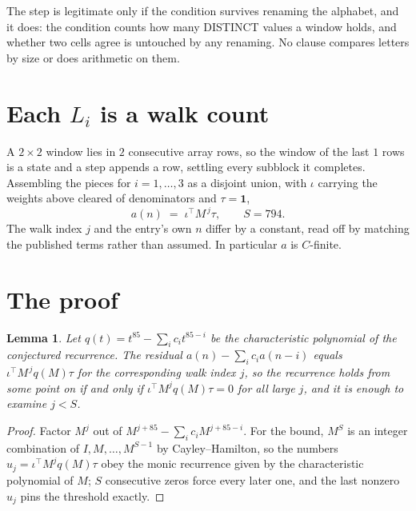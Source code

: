 \documentclass[11pt,a4paper]{article}
\theoremstyle{plain}
\newtheorem{lemma}[theorem]{Lemma}
\theoremstyle{definition}
\begin{document}
The step is legitimate only if the condition survives renaming the alphabet, and it does: the
condition counts how many DISTINCT values a window holds, and whether two cells agree is
untouched by any renaming. No clause compares letters by size or does arithmetic on them.

\section{Each $L_i$ is a walk count}

A $2\times2$ window lies in $2$ consecutive array rows, so the window of the last
$1$ rows is a state and a step appends a row, settling every subblock it completes.
Assembling the pieces for $i=1,\dots,3$ as a disjoint union, with $\iota$ carrying the
weights above cleared of denominators and $\tau=\mathbf{1}$,
\[
a(n)\;=\;\iota^{\!\top}M^{\,j}\tau ,\qquad S=794.
\]
The walk index $j$ and the entry's own $n$ differ by a constant, read off by matching the
published terms rather than assumed. In particular $a$ is $C$-finite.

\section{The proof}

\begin{lemma}\label{lem:crit}
Let $q(t)=t^{85}-\sum_i c_it^{85-i}$ be the characteristic polynomial of the
conjectured recurrence. The residual $a(n)-\sum_ic_ia(n-i)$ equals
$\iota^{\!\top}M^{\,j}q(M)\tau$ for the corresponding walk index $j$, so the recurrence
holds from some point on if and only if $\iota^{\!\top}M^{j}q(M)\tau=0$ for all large $j$,
and it is enough to examine $j<S$.
\end{lemma}

\begin{proof}
Factor $M^{j}$ out of $M^{j+85}-\sum_ic_iM^{j+85-i}$. For the bound, $M^{S}$
is an integer combination of $I,M,\dots,M^{S-1}$ by Cayley--Hamilton, so the numbers
$u_j=\iota^{\!\top}M^{j}q(M)\tau$ obey the monic recurrence given by the characteristic
polynomial of $M$; $S$ consecutive zeros force every later one, and the last nonzero $u_j$
pins the threshold exactly.
\end{proof}
\end{document}
